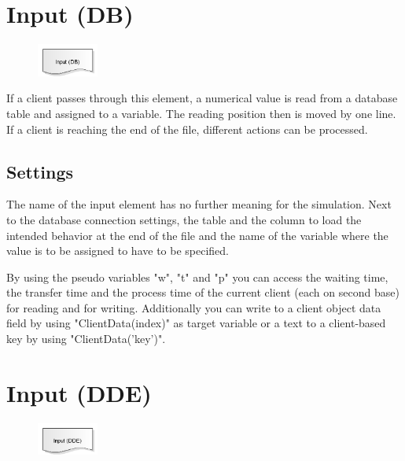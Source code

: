 \section{Input (DB)}
\label{ref:ModelElementInputDB}

\begin{figure}
\vspace{-22pt}
\includegraphics[width=2cm]{imageModelElementInputDB.png}
\vspace{-22pt}
\end{figure}

If a client passes through this element, a numerical value is read from a
database table and assigned to a variable. The reading position then is moved by one line.
If a client is reaching the end of the file, different actions can be processed.

\subsection*{Settings}

The name of the input element has no further meaning for the simulation.
Next to the database connection settings, the table and the column to load
the intended behavior at the end of the file and the name of the variable
where the value is to be assigned to have to be specified.

By using the pseudo variables "w", "t" and "p" you can access the waiting time, the transfer time and the
process time of the current client (each on second base) for reading and for writing. Additionally you can
write to a client object data field by using "ClientData(index)" as target variable or a text to a client-based
key by using "ClientData('key')".


\section{Input (DDE)}
\label{ref:ModelElementInputDDE}

\begin{figure}
\vspace{-22pt}
\includegraphics[width=2cm]{imageModelElementInputDDE.png}
\vspace{-22pt}
\end{figure}

